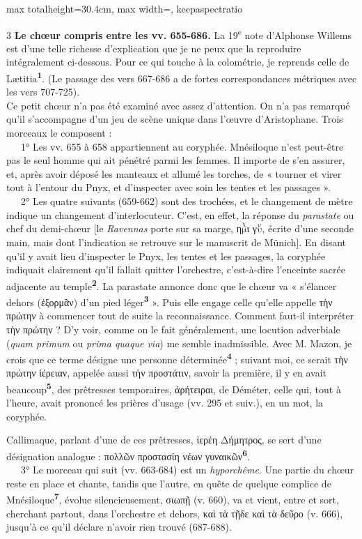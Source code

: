 \documentclass[11pt,twoside]{book}
\newcommand{\italique}[1]{\textit{#1}}
\newcommand{\nieme}[1]{#1\textsuperscript{e}}
\newcommand{\auDessus}[2]{$\overset{\text{#2}}{\text{#1}}$}
\newcommand{\latin}[1]{\textit{#1}}
\newcommand{\marqueur}[1]{\textsuperscript{\color{rubricRed}\textbf{#1}}}
\begin{document}
\begin{adjustbox}{max totalheight=30.4cm, max width=\textwidth, keepaspectratio}
\begin{minipage}{\textwidth}
{\begin{multicols}{3}
 \textbf{Le chœur compris entre les vv. 655-686.} La \nieme{19} note d'Alphonse Willems est d'une telle richesse d'explication que je ne peux que la reproduire intégralement ci-dessous. Pour ce qui touche à la colométrie, je reprends celle de Lætitia\marqueur{1}. (Le passage des vers 667-686 a de fortes correspondances métriques avec les vers 707-725).\\ Ce petit chœur n'a pas été examiné avec assez d'attention. On n'a pas remarqué qu'il s'accompagne d'un jeu de scène unique dans l'œuvre d'Aristophane. Trois morceaux le composent : \\ \ \ \ 1° Les vv. 655 à 658 appartiennent au coryphée. Mnésiloque n'est peut-être pas le seul homme qui ait pénétré parmi les femmes. Il importe de s'en assurer, et, après avoir déposé les manteaux et allumé les torches, de « tourner et virer tout à l'entour du Pnyx, et d'inspecter avec soin les tentes et les passages ».\\ \ \ \ 2° Les quatre suivants (659-662) sont des trochées, et le changement de mètre indique un changement d'interlocuteur. C'est, en effet, la réponse du \italique{parastate} ou chef du demi-chœur [le \italique{Ravennas} porte sur sa marge, η\auDessus{μ}{χ}ι γ\auDessus{υ}{ν}, écrite d'une seconde main, mais dont l'indication se retrouve sur le manuscrit de Münich]. En disant qu'il y avait lieu d'inspecter le Pnyx, les tentes et les passages, la coryphée indiquait clairement qu'il fallait quitter l'orchestre, c'est-à-dire l'enceinte sacrée adjacente au temple\marqueur{2}. La parastate annonce donc que le chœur va « s'élancer dehors (ἐξορμᾶν) d'un pied léger\marqueur{3} ». Puis elle engage celle qu'elle appelle τὴν πρώτην à commencer tout de suite la reconnaissance. Comment faut-il interpréter τὴν πρώτην ? D'y voir, comme on le fait généralement, une locution adverbiale (\latin{quam primum} ou \latin{prima quaque via}) me semble inadmissible. Avec M. Mazon, je crois que ce terme désigne une personne déterminée\marqueur{4} ; suivant moi, ce serait τὴν πρώτην ἱέρειαν, appelée aussi τὴν προστάτιν, savoir la première, il y en avait beaucoup\marqueur{5}, des prêtresses temporaires, ἀρήτειραι, de Déméter, celle qui, tout à l'heure, avait prononcé les prières d'usage (vv. 295 et suiv.), en un mot, la coryphée.
\par\vspace{1.5pt}
\noindent Callimaque, parlant d'une de ces prêtresses, ἱερέη Δήμητρος, se sert d'une désignation analogue : πολλῶν προστασίη νέων γυναικῶν\marqueur{6}. \\ \ \ \ 3° Le morceau qui suit (vv. 663-684) est un \italique{hyporchême}. Une partie du chœur reste en place et chante, tandis que l'autre, en quête de quelque complice de Mnésiloque\marqueur{7}, évolue silencieusement, σιωπῇ (v. 660), va et vient, entre et sort, cherchant partout, dans l'orchestre et dehors, καὶ τὰ τῇδε καὶ τὰ δεῦρο (v. 666), jusqu'à ce qu'il déclare n'avoir rien trouvé (687-688).\\

\end{multicols}}
\end{minipage}
\end{adjustbox}
\end{document}
